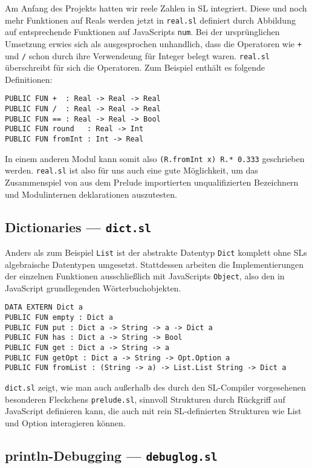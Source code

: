 \documentclass[runningheads]{llncs}
\begin{document}
Am Anfang des Projekts hatten wir reele Zahlen in SL integriert. Diese und
noch mehr Funktionen auf Reals werden jetzt in \verb|real.sl| definiert
durch Abbildung auf entsprechende Funktionen auf JavaScripts \verb|num|.
Bei der ursprünglichen Umsetzung erwies sich als ausgesprochen
unhandlich, dass die Operatoren wie \verb|+| und \verb|/| schon durch ihre
Verwendeung für Integer belegt waren. \verb|real.sl| überschreibt für sich
die Operatoren. Zum Beispiel enthält es folgende Definitionen:

\begin{verbatim}
PUBLIC FUN +  : Real -> Real -> Real
PUBLIC FUN /  : Real -> Real -> Real
PUBLIC FUN == : Real -> Real -> Bool
PUBLIC FUN round   : Real -> Int
PUBLIC FUN fromInt : Int -> Real
\end{verbatim}

In einem anderen Modul kann somit also \verb|(R.fromInt x) R.* 0.333|
geschrieben werden. \verb|real.sl| ist also für uns auch eine gute
Möglichkeit, um das Zusammenspiel von aus dem Prelude importierten
unqualifizierten Bezeichnern und Modulinternen deklarationen auszutesten.

\subsection{Dictionaries --- \texttt{dict.sl}}

Anders als zum Beispiel \verb|List| ist der abstrakte Datentyp \verb|Dict|
komplett ohne SLs algebraische Datentypen umgesetzt. Stattdessen arbeiten
die Implementierungen der einzelnen Funktionen ausschließlich mit JavaScripts
\verb|Object|, also den in JavaScript grundlegenden Wörterbuchobjekten.

\begin{verbatim}
DATA EXTERN Dict a
PUBLIC FUN empty : Dict a
PUBLIC FUN put : Dict a -> String -> a -> Dict a
PUBLIC FUN has : Dict a -> String -> Bool
PUBLIC FUN get : Dict a -> String -> a
PUBLIC FUN getOpt : Dict a -> String -> Opt.Option a
PUBLIC FUN fromList : (String -> a) -> List.List String -> Dict a
\end{verbatim}

\verb|dict.sl| zeigt, wie man auch außerhalb des durch den SL-Compiler
vorgesehenen besonderen Fleckchens \verb|prelude.sl|, sinnvoll Strukturen
durch Rückgriff auf JavaScript definieren kann, die auch mit rein
SL-definierten Strukturen wie List und Option interagieren können.

\subsection{println-Debugging --- \texttt{debuglog.sl}}
\end{document}
